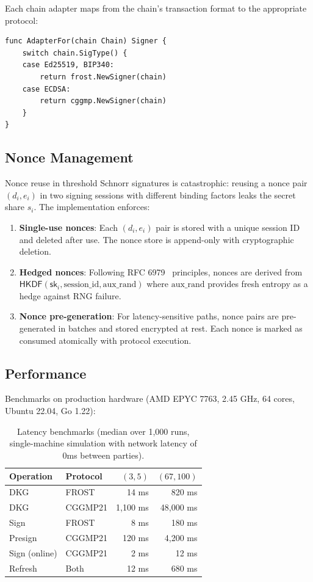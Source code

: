 \documentclass[11pt,twocolumn]{article}
\begin{document}
Each chain adapter maps from the chain's transaction format to the appropriate
protocol:

\begin{verbatim}
func AdapterFor(chain Chain) Signer {
    switch chain.SigType() {
    case Ed25519, BIP340:
        return frost.NewSigner(chain)
    case ECDSA:
        return cggmp.NewSigner(chain)
    }
}
\end{verbatim}

\subsection{Nonce Management}

Nonce reuse in threshold Schnorr signatures is catastrophic: reusing a nonce pair
$(d_i, e_i)$ in two signing sessions with different binding factors leaks the
secret share $s_i$. The implementation enforces:

\begin{enumerate}[nosep]
  \item \textbf{Single-use nonces}: Each $(d_i, e_i)$ pair is stored with a unique
    session ID and deleted after use. The nonce store is append-only with
    cryptographic deletion.
  \item \textbf{Hedged nonces}: Following RFC 6979~\cite{rfc6979} principles, nonces
    are derived from $\mathsf{HKDF}(\mathsf{sk}_i, \text{session\_id}, \text{aux\_rand})$
    where $\text{aux\_rand}$ provides fresh entropy as a hedge against
    RNG failure.
  \item \textbf{Nonce pre-generation}: For latency-sensitive paths, nonce pairs are
    pre-generated in batches and stored encrypted at rest. Each nonce is marked as
    consumed atomically with protocol execution.
\end{enumerate}

\subsection{Performance}

Benchmarks on production hardware (AMD EPYC 7763, 2.45 GHz, 64 cores, Ubuntu 22.04,
Go 1.22):

\begin{table}[H]
\centering
\small
\begin{tabular}{@{}llrr@{}}
\toprule
\textbf{Operation} & \textbf{Protocol} & \textbf{$(3,5)$} & \textbf{$(67,100)$} \\
\midrule
DKG & FROST & 14 ms & 820 ms \\
DKG & CGGMP21 & 1,100 ms & 48,000 ms \\
Sign & FROST & 8 ms & 180 ms \\
Presign & CGGMP21 & 120 ms & 4,200 ms \\
Sign (online) & CGGMP21 & 2 ms & 12 ms \\
Refresh & Both & 12 ms & 680 ms \\
\bottomrule
\end{tabular}
\caption{Latency benchmarks (median over 1,000 runs, single-machine simulation with
network latency of 0ms between parties).}
\label{tab:perf}
\end{table}
\end{document}
